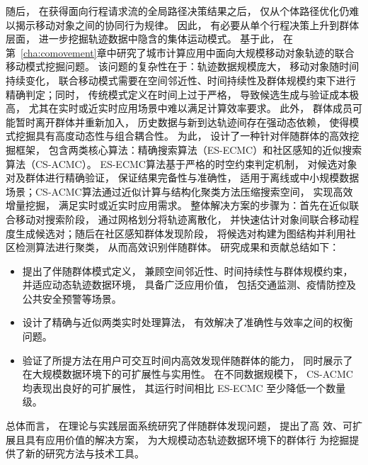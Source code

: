 随后， 在获得面向行程请求流的全局路径决策结果之后， 仅从个体路径优化仍难以揭示移动对象之间的协同行为规律。 因此， 有必要从单个行程决策上升到群体层面， 进一步挖掘轨迹数据中隐含的集体运动模式。 基于此， 在第~\ref{cha:comovement}章中研究了城市计算应用中面向大规模移动对象轨迹的联合移动模式挖掘问题。 该问题的复杂性在于：轨迹数据规模庞大， 移动对象随时间持续变化， 联合移动模式需要在空间邻近性、时间持续性及群体规模约束下进行精确判定；同时， 传统模式定义在时间上过于严格， 导致候选生成与验证成本极高， 尤其在实时或近实时应用场景中难以满足计算效率要求。 此外， 群体成员可能暂时离开群体并重新加入， 历史数据与新到达轨迹间存在强动态依赖， 使得模式挖掘具有高度动态性与组合耦合性。 为此， 设计了一种针对伴随群体的高效挖掘框架， 包含两类核心算法：精确搜索算法（ES-ECMC）和社区感知的近似搜索算法（CS-ACMC）。 ES-ECMC算法基于严格的时空约束判定机制， 对候选对象对及群体进行精确验证， 保证结果完备性与准确性， 适用于离线或中小规模数据场景；CS-ACMC算法通过近似计算与结构化聚类方法压缩搜索空间， 实现高效增量挖掘， 满足实时或近实时应用需求。 整体解决方案的步骤为：首先在近似联合移动对搜索阶段， 通过网格划分将轨迹离散化， 并快速估计对象间联合移动程度生成候选对；随后在社区感知群体发现阶段， 将候选对构建为图结构并利用社区检测算法进行聚类， 从而高效识别伴随群体。 研究成果和贡献总结如下：
\begin{itemize}
    \item 提出了伴随群体模式定义， 兼顾空间邻近性、时间持续性与群体规模约束， 并适应动态轨迹数据环境， 具备广泛应用价值， 包括交通监测、疫情防控及公共安全预警等场景。
    \item 设计了精确与近似两类实时处理算法， 有效解决了准确性与效率之间的权衡问题。
    \item 验证了所提方法在用户可交互时间内高效发现伴随群体的能力， 同时展示了在大规模数据环境下的可扩展性与实用性。 在不同数据规模下， CS-ACMC 均表现出良好的可扩展性， 其运行时间相比 ES-ECMC 至少降低一个数量级。
\end{itemize}
总体而言， 在理论与实践层面系统研究了伴随群体发现问题， 提出了高
效、可扩展且具有应用价值的解决方案， 为大规模动态轨迹数据环境下的群体行
为挖掘提供了新的研究方法与技术工具。


